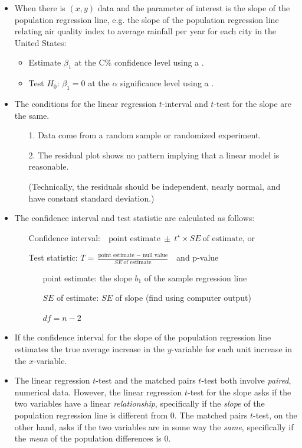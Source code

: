 \begin{itemize}
\item When there is $(x, y)$ data and the parameter of interest is the slope of the population regression line, e.g. the slope of the population regression line relating air quality index to average rainfall per year for each city in the United States:
\begin{itemize}
\item Estimate $\beta_1$ at the C\% confidence level using a .
\item Test $H_0$: $\beta_1=0$ at the $\alpha$ significance level using a .
\end{itemize}
\item The conditions for the linear regression $t$-interval and $t$-test for the slope are the same.
\begin{itemize}
\setlength{\itemsep}{0mm}
\item[1.] Data come from a random sample or randomized experiment.
\item[2.] The residual plot shows no pattern implying that a linear model is reasonable. \item[] (Technically, the residuals should be independent, nearly normal, and have constant standard deviation.)
\end{itemize}
\item The confidence interval and test statistic are calculated as follows:   
\begin{itemize}
\item[] Confidence interval:\ \  $\text{point estimate}\ \pm\ t^{\star} \times SE\ \text{of estimate}$, or
\item[] Test statistic:  $T = \frac{\text{point estimate } - \text{ null value}}{SE\ \text{of estimate}}$ \ and p-value
\begin{itemize}
\item[] point estimate:  the slope $b_1$ of the sample regression line
\item[] $SE$ of estimate:  $SE$ of slope (find using computer output)
\item[] $df = n-2$
\end{itemize}
\end{itemize}


\item If the confidence interval for the slope of the population regression line estimates the true average increase in the $y$-variable for each unit increase in the $x$-variable.

\item The linear regression $t$-test and the matched pairs $t$-test both involve \emph{paired}, numerical data.  However, the linear regression $t$-test for the slope asks if the two variables have a linear \emph{relationship}, specifically if the \emph{slope} of the population regression line is different from 0.  The matched pairs $t$-test, on the other hand, asks if the two variables are in some way the \emph{same}, specifically if the \emph{mean} of the population differences is 0.  
\end{itemize}

